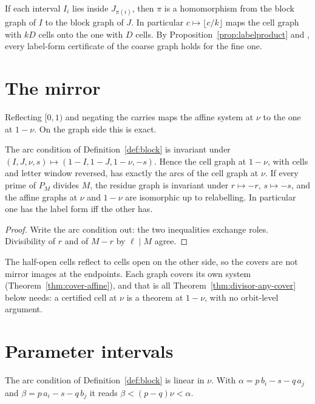 \begin{proposition}[refinement]\label{prop:refine}
If each interval \(I_i\) lies inside \(J_{\pi(i)}\), then \(\pi\) is a homomorphism from the
block graph of \(I\) to the block graph of \(J\). In particular \(c\mapsto\lfloor c/k\rfloor\)
maps the cell graph with \(kD\) cells onto the one with \(D\) cells. By
Proposition~\ref{prop:labelproduct} and , every label-form certificate of
the coarse graph holds for the fine one.
\end{proposition}

\section{The mirror}\label{sec:mirror}

Reflecting \([0,1)\) and negating the carries maps the affine system at \(\nu\) to the one at
\(1-\nu\). On the graph side this is exact.

\begin{proposition}\label{prop:mirror}
The arc condition of Definition~\ref{def:block} is invariant under
\((I,J,\nu,s)\mapsto(1-I,1-J,1-\nu,-s)\). Hence the cell graph at \(1-\nu\), with cells and letter
window reversed, has exactly the arcs of the cell graph at \(\nu\). If every prime of \(P_M\)
divides \(M\), the residue graph is invariant under \(r\mapsto-r\), \(s\mapsto-s\), and the affine
graphs at \(\nu\) and \(1-\nu\) are isomorphic up to relabelling. In particular one has the label
form iff the other has.
\end{proposition}

\begin{proof}
Write the arc condition out: the two inequalities exchange roles. Divisibility of \(r\) and of
\(M-r\) by \(\ell\mid M\) agree.
\end{proof}

The half-open cells reflect to cells open on the other side, so the covers are not mirror
images at the endpoints. Each graph covers its own system (Theorem~\ref{thm:cover-affine}),
and that is all Theorem~\ref{thm:divisor-any-cover} below needs: a certified cell at \(\nu\) is
a theorem at \(1-\nu\), with no orbit-level argument.

\section{Parameter intervals}

The arc condition of Definition~\ref{def:block} is linear in \(\nu\). With
\(\alpha=p\,b_i-s-q\,a_j\) and \(\beta=p\,a_i-s-q\,b_j\) it reads \(\beta<(p-q)\nu<\alpha\).

